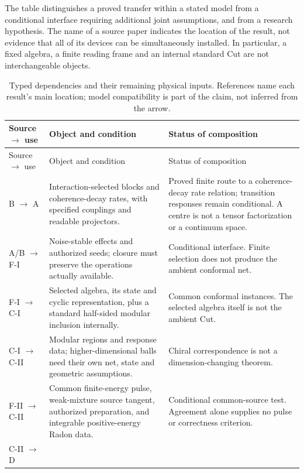 \documentclass[11pt,a4paper]{article}
\begin{document}
The table distinguishes a proved transfer within a stated model from a
conditional interface requiring additional joint assumptions, and from
a research hypothesis. The name of a source paper indicates the
location of the result, not evidence that all of its devices can be
simultaneously installed. In particular, a fixed algebra, a finite
reading frame and an internal standard Cut are not interchangeable
objects.

\begingroup\small
\setlength{\tabcolsep}{4pt}
\begin{longtable}{@{}P{.18\textwidth}P{.44\textwidth}P{.32\textwidth}@{}}
\caption{Typed dependencies and their remaining physical inputs.
References name each result's main location; model compatibility is
part of the claim, not inferred from the arrow.}
\label{tab:interfaces}\\
\toprule
Source $\to$ use & Object and condition & Status of composition\\
\midrule
\endfirsthead
\toprule Source $\to$ use & Object and condition & Status of composition\\
\midrule\endhead
B $\to$ A \cite{HAFFB,HAFFA} &
Interaction-selected blocks and coherence-decay rates, with
specified couplings and readable projectors. &
Proved finite route to a coherence-decay rate relation; transition
responses remain conditional. A centre is not a tensor factorization
or a continuum space.\\
A/B $\to$ F-I \cite{HAFFA,HAFFB,FoundationI} &
Noise-stable effects and authorized seeds; closure must preserve the
operations actually available. &
Conditional interface. Finite selection does not produce the ambient
conformal net.\\
F-I $\to$ C-I \cite{FoundationI,PaperI} &
Selected algebra, its state and cyclic representation, plus a standard
half-sided modular inclusion internally. &
Common conformal instances. The selected algebra itself is not the
ambient Cut.\\
C-I $\to$ C-II \cite{PaperI,PaperII} &
Modular regions and response data; higher-dimensional balls need their
own net, state and geometric assumptions. &
Chiral correspondence is not a dimension-changing theorem.\\
F-II $\to$ C-II \cite{FoundationII,PaperII} &
Common finite-energy pulse, weak-mixture source tangent, authorized
preparation, and integrable positive-energy Radon data. &
Conditional common-source test. Agreement alone supplies no pulse or
correctness criterion.\\
C-II $\to$ D \cite{PaperII,HAFFD} &

\end{longtable}
\end{document}

